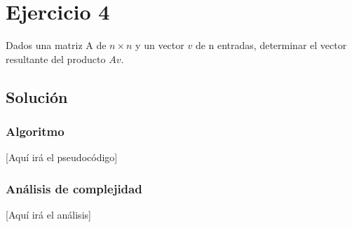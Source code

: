 \section{Ejercicio 4}
Dados una matriz A de $n \times n$ y un vector $v$ de n entradas, determinar el vector resultante del producto $Av$.

\subsection*{Solución}
\subsubsection*{Algoritmo}
[Aquí irá el pseudocódigo]

\subsubsection*{Análisis de complejidad}
[Aquí irá el análisis] 